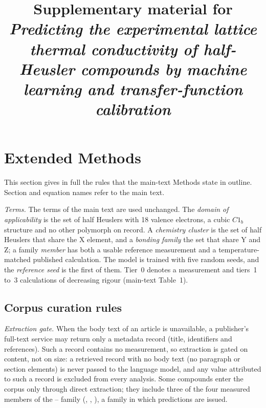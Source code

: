 \documentclass[preprint, 12pt]{elsarticle}
\begin{document}
\begin{frontmatter}
\title{Supplementary material for\\
       \emph{Predicting the experimental lattice thermal conductivity of half-Heusler compounds
       by machine learning and transfer-function calibration}}
\end{frontmatter}

\tableofcontents

\section{Extended Methods}
\label{sec:extmethods}

This section gives in full the rules that the main-text Methods state in outline. Section and
equation names refer to the main text.

\emph{Terms.} The terms of the main text are used unchanged. The \emph{domain of applicability} is
the set of half Heuslers with 18 valence electrons, a cubic $C1_b$ structure and no other polymorph
on record. A \emph{chemistry cluster} is the set of half Heuslers that share the X element, and a
\emph{bonding family} the set that share Y and Z; a family \emph{member} has both a usable reference
measurement and a temperature-matched published calculation. The model is trained with five random
seeds, and the \emph{reference seed} is the first of them. Tier~0 denotes a measurement and
tiers~1 to~3 calculations of decreasing rigour (main-text Table~1).

\subsection*{Corpus curation rules}

\emph{Extraction gate.} When the body text of an article is unavailable, a publisher's full-text
service may return only a metadata record (title, identifiers and references). Such a record
contains no measurement, so extraction is gated on content, not on size: a retrieved record with no
body text (no paragraph or section elements) is never passed to the language model, and any value
attributed to such a record is excluded from every analysis. Some compounds enter the corpus only
through direct extraction; they include three of the four measured members of the --
family (, , ), a family in which predictions are issued.
\end{document}
